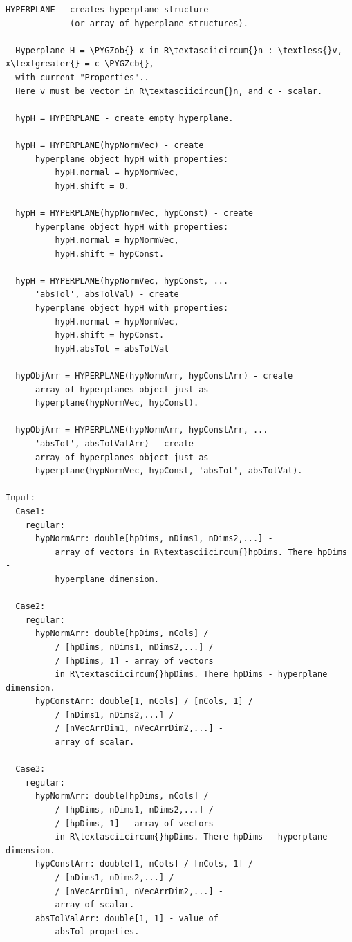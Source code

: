 \documentclass[letterpaper,10pt,english]{sphinxmanual}
\def\PYGZob{\char`\{}
\def\PYGZcb{\char`\}}
\begin{document}
\begin{Verbatim}[commandchars=\\\{\}]
HYPERPLANE - creates hyperplane structure
             (or array of hyperplane structures).

  Hyperplane H = \PYGZob{} x in R\textasciicircum{}n : \textless{}v, x\textgreater{} = c \PYGZcb{},
  with current "Properties"..
  Here v must be vector in R\textasciicircum{}n, and c - scalar.

  hypH = HYPERPLANE - create empty hyperplane.

  hypH = HYPERPLANE(hypNormVec) - create
      hyperplane object hypH with properties:
          hypH.normal = hypNormVec,
          hypH.shift = 0.

  hypH = HYPERPLANE(hypNormVec, hypConst) - create
      hyperplane object hypH with properties:
          hypH.normal = hypNormVec,
          hypH.shift = hypConst.

  hypH = HYPERPLANE(hypNormVec, hypConst, ...
      'absTol', absTolVal) - create
      hyperplane object hypH with properties:
          hypH.normal = hypNormVec,
          hypH.shift = hypConst.
          hypH.absTol = absTolVal

  hypObjArr = HYPERPLANE(hypNormArr, hypConstArr) - create
      array of hyperplanes object just as
      hyperplane(hypNormVec, hypConst).

  hypObjArr = HYPERPLANE(hypNormArr, hypConstArr, ...
      'absTol', absTolValArr) - create
      array of hyperplanes object just as
      hyperplane(hypNormVec, hypConst, 'absTol', absTolVal).

Input:
  Case1:
    regular:
      hypNormArr: double[hpDims, nDims1, nDims2,...] -
          array of vectors in R\textasciicircum{}hpDims. There hpDims -
          hyperplane dimension.

  Case2:
    regular:
      hypNormArr: double[hpDims, nCols] /
          / [hpDims, nDims1, nDims2,...] /
          / [hpDims, 1] - array of vectors
          in R\textasciicircum{}hpDims. There hpDims - hyperplane dimension.
      hypConstArr: double[1, nCols] / [nCols, 1] /
          / [nDims1, nDims2,...] /
          / [nVecArrDim1, nVecArrDim2,...] -
          array of scalar.

  Case3:
    regular:
      hypNormArr: double[hpDims, nCols] /
          / [hpDims, nDims1, nDims2,...] /
          / [hpDims, 1] - array of vectors
          in R\textasciicircum{}hpDims. There hpDims - hyperplane dimension.
      hypConstArr: double[1, nCols] / [nCols, 1] /
          / [nDims1, nDims2,...] /
          / [nVecArrDim1, nVecArrDim2,...] -
          array of scalar.
      absTolValArr: double[1, 1] - value of
          absTol propeties.


\end{Verbatim}
\end{document}
